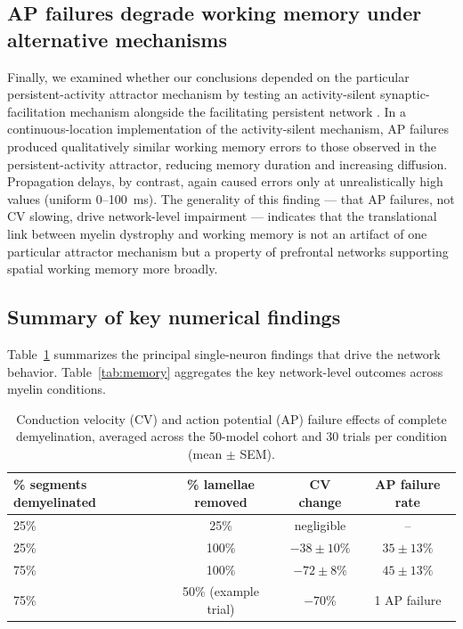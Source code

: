 \documentclass[11pt]{article}
\begin{document}
\subsection{AP failures degrade working memory under alternative mechanisms}

Finally, we examined whether our conclusions depended on the particular persistent-activity attractor mechanism by testing an activity-silent synaptic-facilitation mechanism alongside the facilitating persistent network \citep{mongillo2008synaptic,wolff2015hidden,barbosa2020interplay}. In a continuous-location implementation of the activity-silent mechanism, AP failures produced qualitatively similar working memory errors to those observed in the persistent-activity attractor, reducing memory duration and increasing diffusion. Propagation delays, by contrast, again caused errors only at unrealistically high values (uniform 0--100~ms). The generality of this finding --- that AP failures, not CV slowing, drive network-level impairment --- indicates that the translational link between myelin dystrophy and working memory is not an artifact of one particular attractor mechanism but a property of prefrontal networks supporting spatial working memory more broadly.

\subsection{Summary of key numerical findings}

Table~\ref{tab:demyelination} summarizes the principal single-neuron findings that drive the network behavior. Table~\ref{tab:memory} aggregates the key network-level outcomes across myelin conditions.

\begin{table}[htbp]
\centering
\caption{Conduction velocity (CV) and action potential (AP) failure effects of complete demyelination, averaged across the 50-model cohort and 30 trials per condition (mean $\pm$ SEM).}
\label{tab:demyelination}
\begin{tabular}{lccc}
\toprule
\% segments demyelinated & \% lamellae removed & CV change & AP failure rate \\
\midrule
25\% & 25\% & negligible & -- \\
25\% & 100\% & $-38 \pm 10\%$ & $35 \pm 13\%$ \\
75\% & 100\% & $-72 \pm 8\%$ & $45 \pm 13\%$ \\
75\% & 50\% (example trial) & $-70\%$ & 1 AP failure \\
\bottomrule
\end{tabular}
\end{table}
\end{document}
